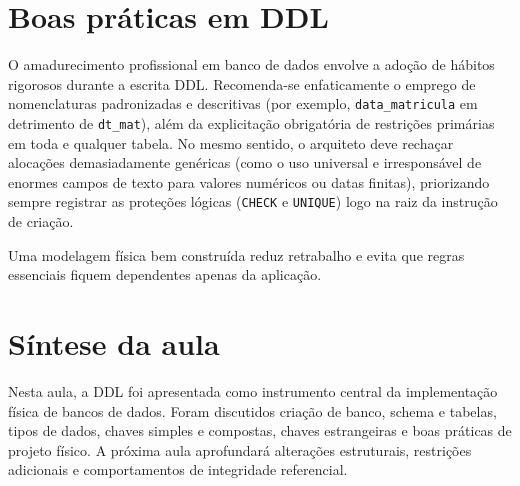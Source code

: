 \section{Boas práticas em DDL}

O amadurecimento profissional em banco de dados envolve a adoção de hábitos rigorosos durante a escrita DDL. Recomenda-se enfaticamente o emprego de nomenclaturas padronizadas e descritivas (por exemplo, \texttt{data\_matricula} em detrimento de \texttt{dt\_mat}), além da explicitação obrigatória de restrições primárias em toda e qualquer tabela. No mesmo sentido, o arquiteto deve rechaçar alocações demasiadamente genéricas (como o uso universal e irresponsável de enormes campos de texto para valores numéricos ou datas finitas), priorizando sempre registrar as proteções lógicas (\texttt{CHECK} e \texttt{UNIQUE}) logo na raiz da instrução de criação.

\begin{quadro_dica}
Uma modelagem física bem construída reduz retrabalho e evita que regras essenciais fiquem dependentes apenas da aplicação.
\end{quadro_dica}

\section{Síntese da aula}

Nesta aula, a DDL foi apresentada como instrumento central da implementação física de bancos de dados. Foram discutidos criação de banco, schema e tabelas, tipos de dados, chaves simples e compostas, chaves estrangeiras e boas práticas de projeto físico. A próxima aula aprofundará alterações estruturais, restrições adicionais e comportamentos de integridade referencial.